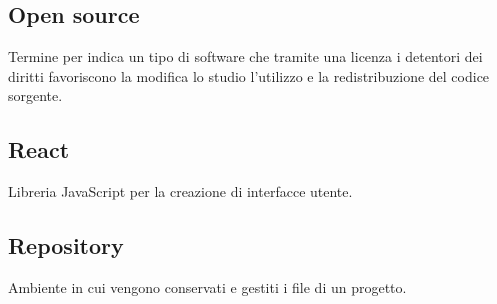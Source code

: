     \subsection{Open source}
    Termine per indica un tipo di software che tramite una licenza i detentori dei diritti favoriscono
    la modifica lo studio l’utilizzo e la redistribuzione del codice sorgente.
    \subsection{React}
    Libreria JavaScript per la creazione di interfacce utente.
    \subsection{Repository}
    Ambiente in cui vengono conservati e gestiti i file di un progetto.